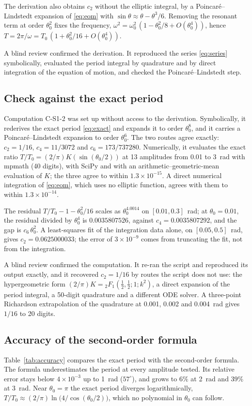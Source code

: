 \documentclass[11pt]{article}
\begin{document}
The derivation also obtains $c_2$ without the elliptic integral, by a
Poincar\'e--Lindstedt expansion of \eqref{eq:eom} with
$\sin\theta \approx \theta - \theta^3/6$. Removing the resonant term at order
$\theta_0^2$ fixes the frequency,
$\omega^2 = \omega_0^2\,(1 - \theta_0^2/8 + O(\theta_0^4))$, hence
$T = 2\pi/\omega = T_0\,(1 + \theta_0^2/16 + O(\theta_0^4))$.

A blind review confirmed the derivation. It reproduced the series
\eqref{eq:series} symbolically, evaluated the period integral by quadrature and
by direct integration of the equation of motion, and checked the
Poincar\'e--Lindstedt step.

\subsection{Check against the exact period}
Computation C-S1-2 was set up without access to the derivation. Symbolically,
it rederives the exact period \eqref{eq:exact} and expands it to order
$\theta_0^8$, and it carries a Poincar\'e--Lindstedt expansion to order
$\theta_0^6$. The two routes agree exactly: $c_2 = 1/16$, $c_4 = 11/3072$ and
$c_6 = 173/737280$. Numerically, it evaluates the exact ratio
$T/T_0 = (2/\pi)K(\sin(\theta_0/2))$ at 13 amplitudes from 0.01 to 3~rad with
mpmath (40 digits), with SciPy and with an arithmetic--geometric-mean
evaluation of $K$; the three agree to within $1.3\times10^{-15}$. A direct
numerical integration of \eqref{eq:eom}, which uses no elliptic function,
agrees with them to within $1.3\times10^{-14}$.

The residual
$T/T_0 - 1 - \theta_0^2/16$ scales as $\theta_0^{4.0014}$ on $[0.01, 0.3]$~rad;
at $\theta_0 = 0.01$, the residual divided by $\theta_0^4$ is $0.0035807526$,
against $c_4 = 0.0035807292$, and the gap is $c_6\,\theta_0^2$. A least-squares
fit of the integration data alone, on $[0.05, 0.5]$~rad, gives
$c_2 = 0.0625000033$; the error of $3\times10^{-9}$ comes from truncating the
fit, not from the integration.

A blind review confirmed the computation. It re-ran the script and reproduced
its output exactly, and it recovered $c_2 = 1/16$ by routes the script does not
use: the hypergeometric form $(2/\pi)K = {}_2F_1(\tfrac12,\tfrac12;1;k^2)$, a
direct expansion of the period integral, a 50-digit quadrature and a different
ODE solver. A three-point Richardson extrapolation of the quadrature at 0.001,
0.002 and 0.004~rad gives $1/16$ to 20 digits.

\subsection{Accuracy of the second-order formula}
Table~\ref{tab:accuracy} compares the exact period with the second-order
formula. The formula underestimates the period at every amplitude tested. Its
relative error stays below $4\times10^{-3}$ up to 1~rad ($57^\circ$), and grows
to $6\%$ at 2~rad and $39\%$ at 3~rad. Near $\theta_0 = \pi$ the exact period
diverges logarithmically, $T/T_0 \approx (2/\pi)\ln\bigl(4/\cos(\theta_0/2)\bigr)$,
which no polynomial in $\theta_0$ can follow.
\end{document}
